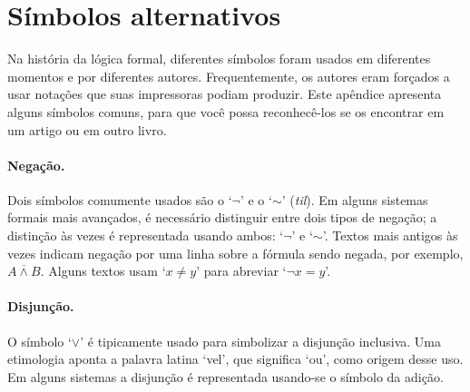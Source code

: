 \section{Símbolos alternativos}
Na história da lógica formal, diferentes símbolos foram usados em diferentes momentos e por diferentes autores. Frequentemente, os autores eram forçados a usar notações que suas impressoras podiam produzir. Este apêndice apresenta alguns símbolos comuns, para que você possa reconhecê-los se os encontrar em um artigo ou em outro livro. 

\paragraph{Negação.} Dois símbolos comumente usados são o `$\neg$' e o `${\sim}$' (\emph{til}). Em alguns sistemas formais mais avançados, é necessário distinguir entre dois tipos de negação; a distinção às vezes é representada usando ambos: `$\neg$' e `${\sim}$'. Textos mais antigos às vezes indicam negação por uma linha sobre a fórmula sendo negada, por exemplo, $\overline{A \land B}$. Alguns textos usam `$x \neq y$' para abreviar `$\lnot x = y$'.

\paragraph{Disjunção.} O símbolo `$\vee$' é tipicamente usado para simbolizar a disjunção inclusiva. Uma etimologia aponta a palavra latina `vel', que significa `ou', como origem desse uso. Em alguns sistemas a disjunção é representada usando-se o símbolo da adição.

